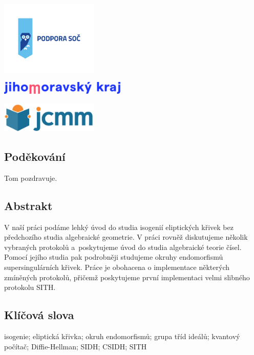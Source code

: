 \documentclass[12pt]{report}
\begin{document}
\newpage
\thispagestyle{empty}
\begin{center}
\includegraphics[width=0.35\textwidth]{podpora_soc-horizontalni.png}
\end{center}
\vspace*{1.5cm}
\begin{center}
\includegraphics[width=0.45\textwidth]{logo_JMK_pruhledne.png}
\end{center}
\vspace*{2.2cm}
\begin{center}
\includegraphics[width=0.35\textwidth]{jcmm-logotype-positive1.png}
\end{center}
\vspace*{6.5cm}
\subsection*{Poděkování}
Tom pozdravuje.


\newpage
\thispagestyle{empty}
\subsection*{Abstrakt}
V naší práci podáme lehký úvod do studia isogenií eliptických křivek bez předchozího studia algebraické geometrie. V práci rovněž diskutujeme několik vybraných protokolů a~poskytujeme úvod do studia algebraické teorie čísel. Pomocí jejího studia pak podrobněji studujeme okruhy endomorfismů supersingulárních křivek. Práce je obohacena o implementace některých zmíněných protokolů, přičemž poskytujeme první implementaci velmi slibného protokolu SITH.


\subsection*{Klíčová slova}
isogenie; eliptická křivka; okruh endomorfismů; grupa tříd ideálů; kvantový počítač; Diffie-Hellman; SIDH; CSIDH; SITH
\end{document}
